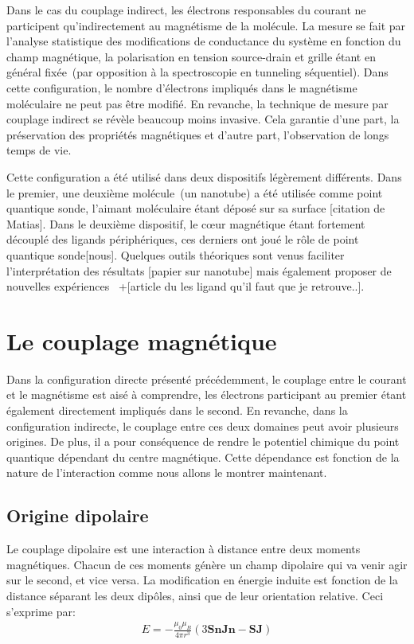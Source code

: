 Dans le cas du couplage indirect, les électrons responsables du courant ne participent qu'indirectement au magnétisme de la molécule. La mesure se fait par l'analyse statistique des modifications de conductance du système en fonction du champ magnétique, la polarisation en tension source-drain et grille étant en général fixée~(par opposition à la spectroscopie en tunneling séquentiel). Dans cette configuration, le nombre d'électrons impliqués dans le magnétisme moléculaire ne peut pas être modifié. En revanche, la technique de mesure par couplage indirect se révèle beaucoup moins invasive. Cela garantie d'une part, la préservation des propriétés magnétiques et d'autre part, l'observation de longs temps de vie. 

Cette configuration a été utilisé dans deux dispositifs légèrement différents. Dans le premier, une deuxième molécule~(un nanotube) a été utilisée comme point quantique sonde, l'aimant moléculaire étant déposé sur sa surface [citation de Matias]. Dans le deuxième dispositif, le cœur magnétique étant fortement découplé des ligands périphériques, ces derniers ont joué le rôle de point quantique sonde[nous]. Quelques outils théoriques sont venus faciliter l'interprétation des résultats [papier sur nanotube] mais également proposer de nouvelles expériences~\cite{Jaafar2010} +[article du les ligand qu'il faut que je retrouve..].

\section{Le couplage magnétique}
Dans la configuration directe présenté précédemment, le couplage entre le courant et le magnétisme est aisé à comprendre, les électrons participant au premier étant également directement impliqués dans le second. En revanche, dans la configuration indirecte, le couplage entre ces deux domaines peut avoir plusieurs origines. De plus, il a pour conséquence de rendre le potentiel chimique du point quantique dépendant du centre magnétique. Cette dépendance est fonction de la nature de l'interaction comme nous allons le montrer maintenant.

\subsection{Origine dipolaire}
Le couplage dipolaire est une interaction à distance entre deux moments magnétiques. Chacun de ces moments génère un champ dipolaire qui va venir agir sur le second, et vice versa. La modification en énergie induite est fonction de la distance séparant les deux dipôles, ainsi que de leur orientation relative. Ceci s'exprime par:
\begin{eqnarray}
E = -\frac{\mu_0 \mu_B}{4\pi r^3}(3\mathbf{SnJn} - \mathbf{SJ}) \nonumber
\end{eqnarray}

